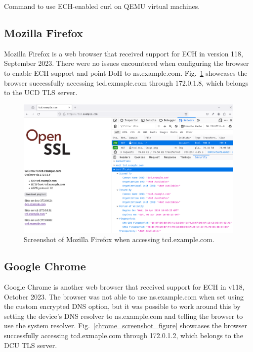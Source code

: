 \begin{listing}[ht]
\inputminted{bash}{snippets/client.bash}
\caption[Command to use ECH-enabled curl on QEMU virtual machines]{Command to use ECH-enabled curl on QEMU virtual machines.}
\label{client.bash}
\end{listing}

\subsection{Mozilla Firefox}

Mozilla Firefox is a web browser that received support for ECH in version 118, September 2023. There were no issues encountered when configuring the browser to enable ECH support and point DoH to ns.example.com. Fig.~\ref{firefox_screenshot_figure} showcases the browser successfully accessing tcd.exmaple.com through 172.0.1.8, which belongs to the UCD TLS server.

\begin{figure}[ht]
\centerline{\includegraphics[width=120mm]{images/firefox.png}}
\caption[Screenshot of Mozilla Firefox when accessing tcd.example.com]{Screenshot of Mozilla Firefox when accessing tcd.example.com.}
\label{firefox_screenshot_figure}
\end{figure}

\subsection{Google Chrome}

Google Chrome is another web browser that received support for ECH in v118, October 2023. The browser was not able to use ns.example.com when set using the custom encrypted DNS option, but it was possible to work around this by setting the device's DNS resolver to ns.example.com and telling the browser to use the system resolver. Fig.~\ref{chrome_screenshot_figure} showcases the browser successfully accessing tcd.exmaple.com through 172.0.1.2, which belongs to the DCU TLS server.

